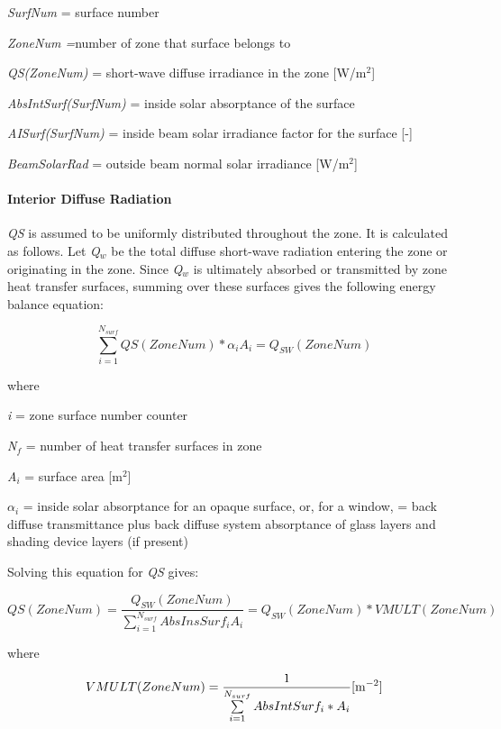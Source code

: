 \emph{SurfNum} = surface number

\emph{ZoneNum =}number of zone that surface belongs to

\emph{QS(ZoneNum)} = short-wave diffuse irradiance in the zone {[}W/m\(^{2}\){]}

\emph{AbsIntSurf(SurfNum)} = inside solar absorptance of the surface

\emph{AISurf(SurfNum)} = inside beam solar irradiance factor for the surface {[}-{]}

\emph{BeamSolarRad} = outside beam normal solar irradiance {[}W/m\(^{2}\){]}

\paragraph{Interior Diffuse Radiation}\label{interior-diffuse-radiation}

\emph{QS} is assumed to be uniformly distributed throughout the zone. It is calculated as follows. Let \emph{Q\(_{w}\)} be the total diffuse short-wave radiation entering the zone or originating in the zone. Since \emph{Q\(_{w}\)} is ultimately absorbed or transmitted by zone heat transfer surfaces, summing over these surfaces gives the following energy balance equation:

\begin{equation}
\sum\limits_{i = 1}^{{N_{surf}}} {QS(ZoneNum)*{\alpha_i}{A_i} = {Q_{SW}}(ZoneNum)}
\end{equation}

where

\emph{i} = zone surface number counter

\emph{N\(_{f}\)} = number of heat transfer surfaces in zone

\emph{A\(_{i}\)} = surface area {[}m\(^{2}\){]}

\({\alpha_i}\) = inside solar absorptance for an opaque surface, or, for a window, = back diffuse transmittance plus back diffuse system absorptance of glass layers and shading device layers (if present)

Solving this equation for \emph{QS} gives:

\begin{equation}
QS(ZoneNum) = \frac{{{Q_{SW}}(ZoneNum)}}{{\sum\limits_{i = 1}^{{N_{surf}}} {AbsInsSur{f_i}{A_i}} }} = {Q_{SW}}(ZoneNum)*VMULT(ZoneNum)
\end{equation}

where

\begin{equation}
VMULT(ZoneNum) = \frac{1}{{\sum\limits_{i = 1}^{{N_{surf}}} {AbsIntSur{f_i}*{A_i}} }}{\rm{    [}}{{\rm{m}}^{{\rm{ - 2}}}}]
\end{equation}


